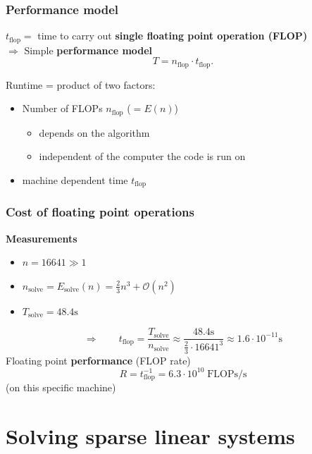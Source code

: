 \documentclass{beamer}
\begin{document}

\begin{frame}[fragile]
  \frametitle{Performance model}
  $t_{\text{flop}} =$ time to carry out \textbf{single floating point operation (FLOP)}\\[1ex]
  $\Rightarrow$ Simple \textbf{performance model}
$$
T = n_{\text{flop}}\cdot t_{\text{flop}}.
$$

Runtime = product of two factors:
\begin{itemize}
\item Number of FLOPs $n_{\text{flop}}$ ($=E(n)$)
\begin{itemize}
\item depends on the algorithm
\item independent of the computer the code is run on
\end{itemize}
\item machine dependent time $t_{\text{flop}}$
\end{itemize}
\end{frame}


\begin{frame}[fragile]
  \frametitle{Cost of floating point operations}
  \textbf{Measurements}
  \begin{itemize}
    \item $n=16641\gg 1$
    \item $n_{\text{solve}}=E_{\text{solve}}(n)=\frac{2}{3}n^3+\mathcal{O}(n^2)$
    \item $T_{\text{solve}}= 48.4\text{s}$
  \end{itemize}
$$
\Rightarrow \qquad t_{\text{flop}} = \frac{T_{\text{solve}}}{n_{\text{solve}}} \approx \frac{48.4\text{s}}{\frac{2}{3}\cdot 16641^3} \approx 1.6\cdot 10^{-11}\text{s}
$$
Floating point \textbf{performance} (FLOP rate)
$$
R = t_{\text{flop}}^{-1} = 6.3\cdot 10^{10} \;\text{FLOPs/s}
$$
(on this specific machine)
\end{frame}


\section{Solving sparse linear systems}

\end{document}

